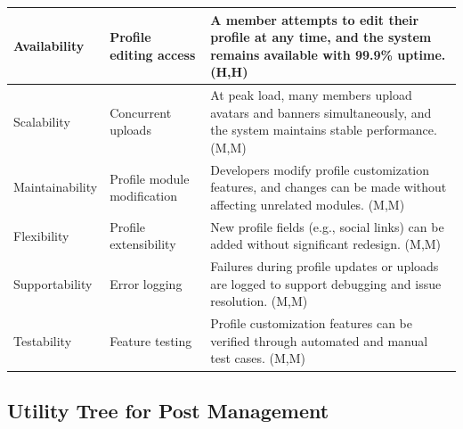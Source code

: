 \documentclass{article}
\begin{document}
\begin{table}[H]
\begin{tabular}{|p{3cm}|p{4cm}|p{7cm}|}
        Availability
                                   & Profile editing access
                                   & A member attempts to edit their profile at any time, and the system remains available with 99.9\% uptime. (H,H)                               \\
        \hline

        Scalability
                                   & Concurrent uploads
                                   & At peak load, many members upload avatars and banners simultaneously, and the system maintains stable performance. (M,M)                      \\
        \hline

        Maintainability
                                   & Profile module modification
                                   & Developers modify profile customization features, and changes can be made without affecting unrelated modules. (M,M)                          \\
        \hline

        Flexibility
                                   & Profile extensibility
                                   & New profile fields (e.g., social links) can be added without significant redesign. (M,M)                                                      \\
        \hline

        Supportability
                                   & Error logging
                                   & Failures during profile updates or uploads are logged to support debugging and issue resolution. (M,M)                                        \\
        \hline

        Testability
                                   & Feature testing
                                   & Profile customization features can be verified through automated and manual test cases. (M,M)                                                 \\
        \hline
    \end{tabular}
\end{table}

\subsection{Utility Tree for Post Management}
\end{document}
